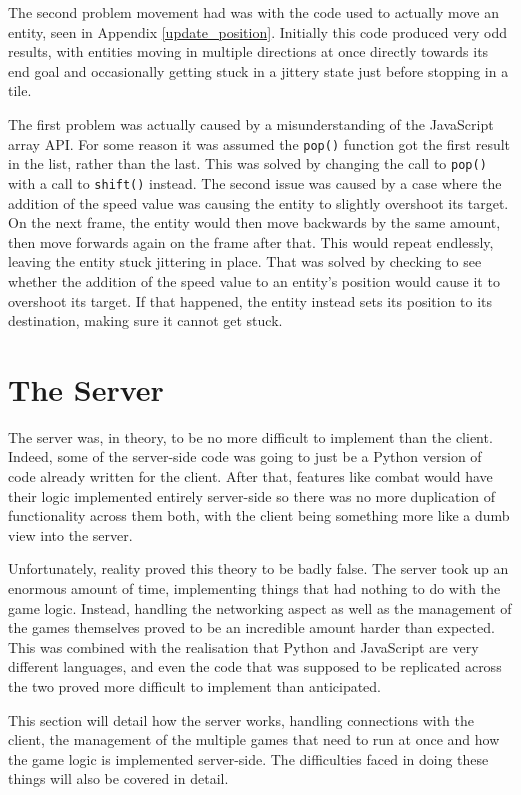 The second problem movement had was with the code used to actually move an entity, seen in Appendix \ref{update_position}. Initially this code produced very odd results, with entities moving in multiple directions at once directly towards its end goal and occasionally getting stuck in a jittery state just before stopping in a tile.

The first problem was actually caused by a misunderstanding of the JavaScript array API. For some reason it was assumed the \texttt{pop()} function got the first result in the list, rather than the last. This was solved by changing the call to \texttt{pop()} with a call to \texttt{shift()} instead. The second issue was caused by a case where the addition of the speed value was causing the entity to slightly overshoot its target. On the next frame, the entity would then move backwards by the same amount, then move forwards again on the frame after that. This would repeat endlessly, leaving the entity stuck jittering in place. That was solved by checking to see whether the addition of the speed value to an entity's position would cause it to overshoot its target. If that happened, the entity instead sets its position to its destination, making sure it cannot get stuck.

\section{The Server}\label{server_implementation}
The server was, in theory, to be no more difficult to implement than the client. Indeed, some of the server-side code was going to just be a Python version of code already written for the client. After that, features like combat would have their logic implemented entirely server-side so there was no more duplication of functionality across them both, with the client being something more like a dumb view into the server.

Unfortunately, reality proved this theory to be badly false. The server took up an enormous amount of time, implementing things that had nothing to do with the game logic. Instead, handling the networking aspect as well as the management of the games themselves proved to be an incredible amount harder than expected. This was combined with the realisation that Python and JavaScript are very different languages, and even the code that was supposed to be replicated across the two proved more difficult to implement than anticipated.

This section will detail how the server works, handling connections with the client, the management of the multiple games that need to run at once and how the game logic is implemented server-side. The difficulties faced in doing these things will also be covered in detail.

